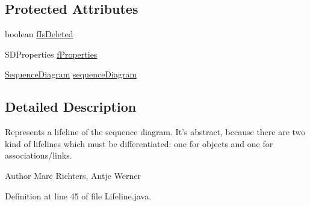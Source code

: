 \subsection*{Protected Attributes}
\begin{DoxyCompactItemize}
\item 
boolean \hyperlink{classorg_1_1tzi_1_1use_1_1gui_1_1views_1_1diagrams_1_1behavior_1_1sequencediagram_1_1_lifeline_a6ed9d69272aea6a14ab32f3d560601e5}{f\-Is\-Deleted}
\item 
S\-D\-Properties \hyperlink{classorg_1_1tzi_1_1use_1_1gui_1_1views_1_1diagrams_1_1behavior_1_1sequencediagram_1_1_lifeline_a5b1024f01406ad26e2c44fff68e492a6}{f\-Properties}
\item 
\hyperlink{classorg_1_1tzi_1_1use_1_1gui_1_1views_1_1diagrams_1_1behavior_1_1sequencediagram_1_1_sequence_diagram}{Sequence\-Diagram} \hyperlink{classorg_1_1tzi_1_1use_1_1gui_1_1views_1_1diagrams_1_1behavior_1_1sequencediagram_1_1_lifeline_ac6ee70b06590bcc61128a0d044dfe882}{sequence\-Diagram}
\end{DoxyCompactItemize}


\subsection{Detailed Description}
Represents a lifeline of the sequence diagram. It's abstract, because there are two kind of lifelines which must be differentiated\-: one for objects and one for associations/links.

\begin{DoxyAuthor}{Author}
Marc Richters, Antje Werner 
\end{DoxyAuthor}


Definition at line 45 of file Lifeline.\-java.



